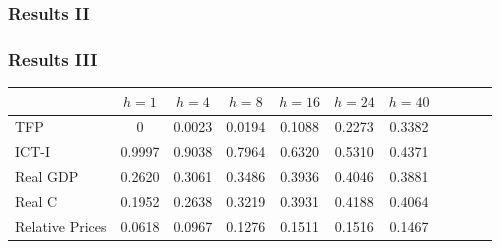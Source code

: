 \documentclass{beamer}
\def \MainFigures{../Draft_Summer2018/MainFigures}
\def\myFigWidth{2.0in}
\begin{document}
\begin{frame}
	\frametitle{Results II}

\begin{figure}[h!]
{} \hspace{.2in%
} 
 \hspace{.2in%
} 
 \hspace{.2in%
} 
\end{figure}	

\end{frame}

\begin{frame}
	\frametitle{Results III}
	
\begin{table}[h!]
 		\begin{center}
 \begin{tabular}{lcccccccccc}
\hline
 	& $h = 1$ & $h = 4$ & $h = 8$ & $h = 16$ & $h = 24$ & $h = 40$ \\
 	\hline
TFP &  0       &  0.0023  &  0.0194 &   0.1088 &   0.2273  &  0.3382 \\
ICT-I &  0.9997  &  0.9038  &  0.7964 &   0.6320 &   0.5310  &  0.4371 \\
Real GDP &  0.2620  &  0.3061  &  0.3486 &   0.3936 &   0.4046  &  0.3881 \\
Real C &  0.1952  &  0.2638  &  0.3219 &   0.3931 &   0.4188  &  0.4064 \\
Relative Prices &  0.0618  &  0.0967  &  0.1276 &   0.1511 &   0.1516  &  0.1467 \\	
\hline
 	\end{tabular}
  \label{table:vardec}
  \end{center}
 \end{table}


\end{frame}
\end{document}
